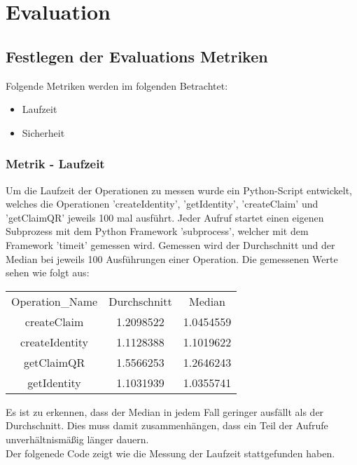 \chapter{Evaluation}
\label{cha:evaluation}

\section{Festlegen der Evaluations Metriken}
Folgende Metriken werden im folgenden Betrachtet:
\begin{itemize}
	\item Laufzeit
	\item Sicherheit
\end{itemize}
\subsection{Metrik - Laufzeit}
Um die Laufzeit der Operationen zu messen wurde ein Python-Script entwickelt, welches die Operationen 'createIdentity', 'getIdentity', 'createClaim' und 'getClaimQR' jeweils 100 mal ausführt. Jeder Aufruf startet einen eigenen Subprozess mit dem Python Framework 'subprocess', welcher mit dem Framework 'timeit' gemessen wird. Gemessen wird der Durchschnitt und der Median bei jeweils 100 Ausführungen einer Operation. Die gemessenen Werte sehen wie folgt aus:

\begin{center}
	\begin{tabular}{ c c c }
		Operation\_Name & Durchschnitt & Median \\
		createClaim & 1.2098522 & 1.0454559 \\
		createIdentity & 1.1128388 & 1.1019622  \\
		getClaimQR & 1.5566253 & 1.2646243 \\
		getIdentity & 1.1031939 & 1.0355741 \\
	\end{tabular}
\end{center}
Es ist zu erkennen, dass der Median in jedem Fall geringer ausfällt als der Durchschnitt. Dies muss damit zusammenhängen, dass ein Teil der Aufrufe unverhältnismäßig länger dauern.\\

Der folgenede Code zeigt wie die Messung der Laufzeit stattgefunden haben.


